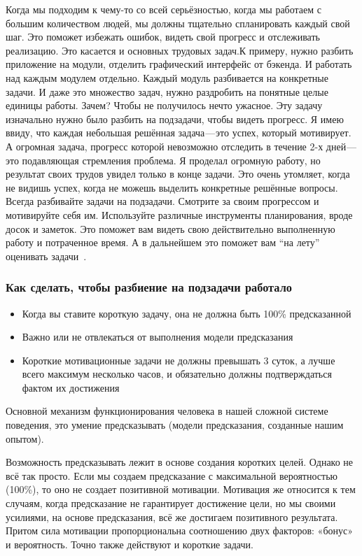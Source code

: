 \documentclass{../industrial-development}
\begin{document}
\lecturenotes

Когда мы подходим к чему-то со всей серьёзностью, когда мы работаем с большим количеством людей, мы должны тщательно спланировать каждый свой шаг. Это поможет избежать ошибок, видеть свой прогресс и отслеживать реализацию.
Это касается и основных трудовых задач.К примеру, нужно разбить приложение на модули, отделить графический интерфейс от бэкенда. И работать над каждым модулем отдельно.
Каждый модуль разбивается на конкретные задачи.
И даже это множество задач, нужно раздробить на понятные целые единицы работы. Зачем? Чтобы не получилось нечто ужасное.
Эту задачу изначально нужно было разбить на подзадачи, чтобы видеть прогресс. Я имею ввиду, что каждая небольшая решённая задача — это успех, который мотивирует. А огромная задача, прогресс которой невозможно отследить в течение 2-х дней — это подавляющая стремления проблема.
Я проделал огромную работу, но результат своих трудов увидел только в конце задачи. Это очень утомляет, когда не видишь успех, когда не можешь выделить конкретные решённые вопросы.
Всегда разбивайте задачи на подзадачи. Смотрите за своим прогрессом и мотивируйте себя им. Используйте различные инструменты планирования, вроде досок и заметок. Это поможет вам видеть свою действительно выполненную работу и потраченное время. А в дальнейшем это поможет вам “на лету” оценивать задачи~\cite{TasksMedium}.

\begin{frame} \frametitle{Как сделать, чтобы разбиение на подзадачи работало}
  \begin{itemize}
  \item Когда вы ставите короткую задачу, она не должна быть 100\% предсказанной
  \item Важно или не отвлекаться от выполнения модели предсказания
  \item Короткие мотивационные задачи не должны превышать 3 суток, а лучше всего максимум несколько часов, и обязательно должны подтверждаться фактом их достижения
  \end{itemize}
\end{frame}

\lecturenotes

Основной механизм функционирования человека в нашей сложной системе поведения, это умение предсказывать (модели предсказания, созданные нашим опытом). 

Возможность предсказывать лежит в основе создания коротких целей. Однако не всё так просто.
Если мы создаем предсказание с максимальной вероятностью (100\%), то оно не создает позитивной мотивации.
Мотивация же относится к тем случаям, когда предсказание не гарантирует достижение цели, но мы своими усилиями, на основе предсказания, всё же достигаем позитивного результата. Притом сила мотивации пропорциональна соотношению двух факторов: «бонус» и вероятность.
Точно также действуют и короткие задачи.
\end{document}
